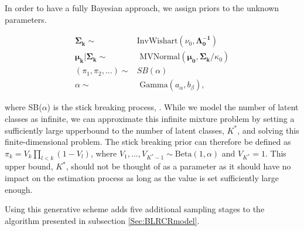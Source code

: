 \documentclass[
  12pt,
]{article}
\begin{document}
In order to have a fully Bayesian approach, we assign priors to the
unknown parameters.

\begin{align}
\boldsymbol{\Sigma_k} \sim & \text{InvWishart}(\nu_{0},\boldsymbol{\Lambda_{0}^{-1}}) \\
\boldsymbol{\mu_k}|\boldsymbol{\Sigma_k} \sim & \text{ MVNormal}(\boldsymbol{\mu_{0}},\boldsymbol{\Sigma_k}/\kappa_{0}) \\
(\pi_1,\pi_2,...) \sim & SB(\alpha) \\
\alpha \sim & \text{ Gamma}(a_{\alpha},b_{\beta}),
\end{align}

where SB(\(\alpha\)) is the stick breaking process,
\citep{ishwaran_gibbs_2001}. While we model the number of latent classes
as infinite, we can approximate this infinite mixture problem by setting
a sufficiently large upperbound to the number of latent classes,
\(K^*\), and solving this finite-dimensional problem. The stick breaking
prior can therefore be defined as \(\pi_k = V_k \prod_{l<k}(1-V_l)\),
where \(V_1, ..., V_{K^*-1} \sim \text{Beta}(1,\alpha)\) and
\(V_{K^*}=1\). This upper bound, \(K^*\), should not be thought of as a
parameter as it should have no impact on the estimation process as long
as the value is set sufficiently large enough.

Using this generative scheme adds five additional sampling stages to the
algorithm presented in subsection \ref{Sec:BLRCRmodel}.
\end{document}
